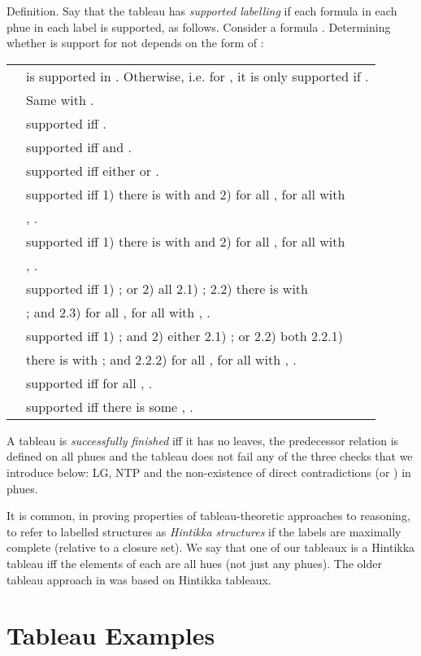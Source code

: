 \documentclass[submission,copyright,creativecommons]{eptcs}
\newenvironment{definition}{Definition. }{}
\begin{document}
\begin{definition}
Say that the tableau 
has {\em supported labelling}
if each formula in each phue in each label
is supported, as follows.
Consider a formula .
Determining whether  is support for not depends on the form
of :

\begin{tabular}{ll}
 &
 is supported in .
Otherwise, i.e. for , it is only supported if .\\
 &
Same with .\\
 &
 supported iff
.\\
 &
 supported iff
 and
.\\
 &
 supported iff either
 or
.\\
 &
 supported iff
1) there is  with 
and
2)
for all , for all  with\\& ,
.\\
 &
 supported iff
1) there is  with  and
2)
for all , for all  with\\&
 ,
.\\
 &
 supported iff
1) ; or
2) all 
2.1) ;
2.2) there is  with\\& ; and
 2.3)
for all , for all  with ,
.\\
 &
 supported iff
1) ;
and 2) either
2.1) ; or
2.2) both 2.2.1)\\ & there is  with ; and
2.2.2) for all , for all  with ,
.\\
 &
 supported iff
for all ,
.\\
 &
 supported iff
there is some ,
.\\
\end{tabular}

\end{definition}

A tableau is {\em successfully finished}
iff it 
has no leaves,
the predecessor relation is defined on all phues
and
the tableau does not fail any of the
three checks that we introduce below:
LG, NTP and
the non-existence of direct contradictions
(or )
in phues.

It is common, in proving properties
of tableau-theoretic approaches
to reasoning,
to refer to labelled
structures as {\em Hintikka structures}
if the labels 
are maximally complete
(relative to a closure set).
We say that one of our tableaux
 is a Hintikka tableau
iff the
elements of each 
are all hues
(not just any phues).
The older tableau approach
in \cite{Rey:startab}
was based on Hintikka tableaux.




\section{Tableau Examples}
\label{sec:tegs}
\end{document}
